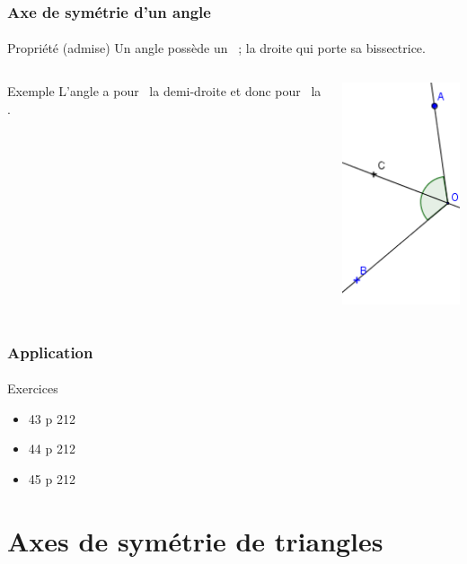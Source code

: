 \documentclass{beamer}
\begin{document}
\begin{frame}
\frametitle{Axe de symétrie d'un angle}  
\framesubtitle{}

\begin{alertblock}{Propriété (admise)}
	Un angle possède un \asym\ ;  la droite qui porte sa bissectrice.\pause
\end{alertblock}

\begin{columns}[c]
	
\begin{column}{7cm}
\begin{exampleblock}{Exemple}
	L'angle  a pour \bissec\ la demi-droite  et donc pour \asym\ la .
\end{exampleblock}
\end{column}

\begin{column}{3cm}
	\includegraphics[scale=0.4]{./img/angle}
\end{column}

\end{columns}
\end{frame}

\begin{frame}
	\frametitle{Application}  
	\framesubtitle{}
	
	\begin{block}{Exercices}
		\begin{itemize}
			\item 43 p 212
			\item 44 p 212
			\item 45 p 212
		\end{itemize}
	\end{block}
\end{frame}

\section{Axes de symétrie de triangles}
\end{document}
